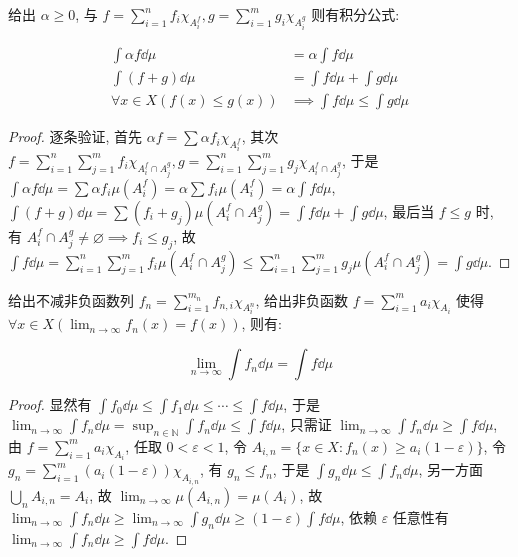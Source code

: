 \begin{lemma}
    给出 \(\alpha \geq 0\), 与 \(f = \sum_{i=1}^{n} f_i \chi_{A^f_i},g = \sum_{i=1}^{m} g_i \chi_{A^g_i}\) 则有积分公式:

    \[
        \begin{aligned}
            \int \alpha f \dd \mu &= \alpha \int f \dd \mu \\
            \int (f+g) \dd \mu &= \int f \dd \mu + \int g \dd \mu \\
            \forall x \in X (f(x) \leq g(x)) &\implies \int f \dd \mu \leq \int g \dd \mu
        \end{aligned}
    \]

    \begin{proof}
        逐条验证, 首先 \(\alpha f = \sum \alpha f_i \chi_{A^f_i}\), 其次 \(f = \sum_{i=1}^{n} \sum_{j=1}^{m} f_i \chi_{A^f_i \cap A^g_j}, g = \sum_{i=1}^{n} \sum_{j=1}^{m} g_j \chi_{A^f_i \cap A^g_j}\),
        于是 \(\int \alpha f \dd \mu = \sum \alpha f_i \mu(A^f_i) = \alpha \sum f_i \mu(A^f_i) = \alpha \int f \dd \mu\), \(\int (f+g) \dd \mu = \sum (f_i + g_j) \mu(A^f_i \cap A^g_j) = \int f \dd \mu + \int g \dd \mu\),
        最后当 \(f \leq g\) 时, 有 \(A^f_i \cap A^g_j \neq \varnothing \implies f_i \leq g_j\), 故 \(\int f \dd \mu = \sum_{i=1}^{n} \sum_{j=1}^{m} f_i \mu(A^f_i \cap A^g_j) \leq \sum_{i=1}^{n} \sum_{j=1}^{m} g_j \mu(A^f_i \cap A^g_j) = \int g \dd \mu\).
    \end{proof}
\end{lemma}

\begin{lemma}
    给出不减非负函数列 \(f_n = \sum_{i=1}^{m_n} f_{n,i} \chi_{A_i^n}\), 给出非负函数 \(f = \sum_{i=1}^{m} a_i \chi_{A_i}\) 使得 \(\forall x \in X (\lim_{n \to \infty} f_n(x) = f(x))\), 则有:

    \[
        \lim_{n \to \infty} \int f_n \dd \mu = \int f \dd \mu
    \]

    \begin{proof}
        显然有 \(\int f_0 \dd \mu \leq \int f_1 \dd \mu \leq \cdots \leq \int f \dd \mu\), 于是 \(\lim_{n \to \infty} \int f_n \dd \mu = \sup_{n \in \mathbb{N}} \int f_n \dd \mu \leq \int f \dd \mu\),
        只需证 \(\lim_{n \to \infty} \int f_n \dd \mu \geq \int f \dd \mu\), 由 \(f = \sum_{i=1}^{m} a_i \chi_{A_i}\), 任取 \(0 < \varepsilon < 1\), 令 \(A_{i,n} = \{x \in X : f_n(x) \geq a_i (1 - \varepsilon)\}\),
        令 \(g_n = \sum_{i=1}^{m} (a_i (1 - \varepsilon)) \chi_{A_{i,n}}\), 有 \(g_n \leq f_n\), 于是 \(\int g_n \dd \mu \leq \int f_n \dd \mu\), 
        另一方面 \(\bigcup_n A_{i,n} = A_i\), 故 \(\lim_{n \to \infty} \mu (A_{i,n}) = \mu (A_i)\), 故 \(\lim_{n \to \infty} \int f_n \dd \mu \geq \lim_{n \to \infty} \int g_n \dd \mu \geq (1 - \varepsilon) \int f \dd \mu\), 
        依赖 \(\varepsilon\) 任意性有 \(\lim_{n \to \infty} \int f_n \dd \mu \geq \int f \dd \mu\).
    \end{proof}
\end{lemma}

